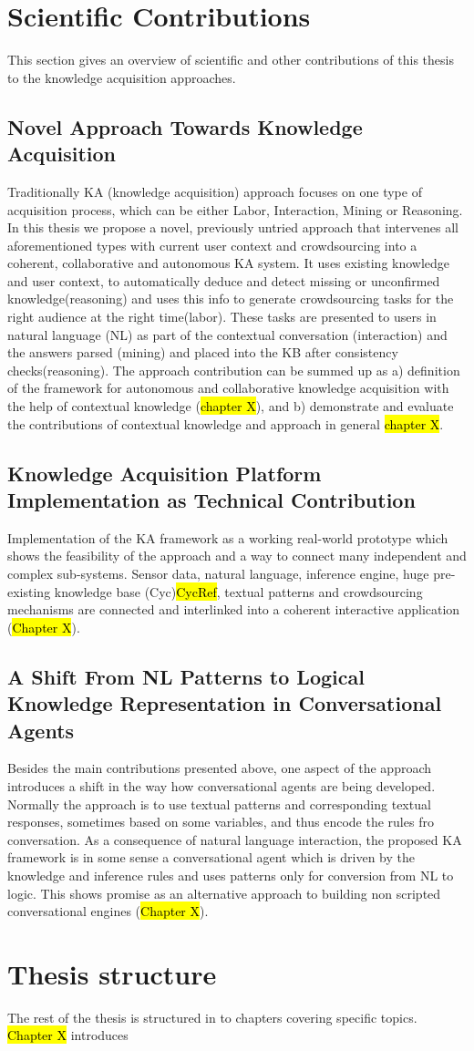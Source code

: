 \section{Scientific Contributions}
This section gives an overview of scientific and other contributions of this thesis to the knowledge acquisition approaches.

\subsection{Novel Approach Towards Knowledge Acquisition}
Traditionally KA (knowledge acquisition) approach focuses on one type of acquisition process, which can be either Labor, Interaction, Mining or Reasoning\parencite{Zang2013}. In this thesis we propose a novel, previously untried approach that intervenes all aforementioned types with current user context and crowdsourcing into a coherent, collaborative and autonomous KA system. It uses existing knowledge and user context, to automatically deduce and detect  missing or unconfirmed knowledge(reasoning) and uses this info to generate crowdsourcing tasks for the right audience at the right time(labor). These tasks are presented to users in natural language (NL) as part of the contextual conversation (interaction) and the answers parsed (mining) and placed into the KB after consistency checks(reasoning). The approach contribution can be summed up as a) definition of the framework for autonomous and collaborative knowledge acquisition with the help of contextual knowledge (\hl{chapter X}), and b) demonstrate and evaluate the contributions of contextual knowledge and approach in general \hl{chapter X}.

\subsection{Knowledge Acquisition Platform Implementation as Technical Contribution }
Implementation of the KA framework as a working real-world prototype which shows the feasibility of the approach and a way to connect many independent and complex sub-systems. Sensor data, natural language, inference engine, huge pre-existing knowledge base (Cyc)\hl{CycRef}, textual patterns and crowdsourcing mechanisms are connected and interlinked into a coherent interactive application (\hl{Chapter X}).

\subsection{A Shift From NL Patterns to Logical Knowledge Representation in Conversational Agents}
Besides the main contributions presented above, one aspect of the approach introduces a shift in the way how conversational agents are being developed. Normally the approach is to use textual patterns and corresponding textual responses, sometimes based on some variables, and thus encode the rules fro conversation. As a consequence of natural language interaction, the proposed KA framework is in some sense a conversational agent which is driven by the knowledge and inference rules and uses patterns only for conversion from NL to logic. This shows promise as an alternative approach to building non scripted conversational engines (\hl{Chapter X}).

\section{Thesis structure}
The rest of the thesis is structured in to chapters covering specific topics. \hl{Chapter X} introduces